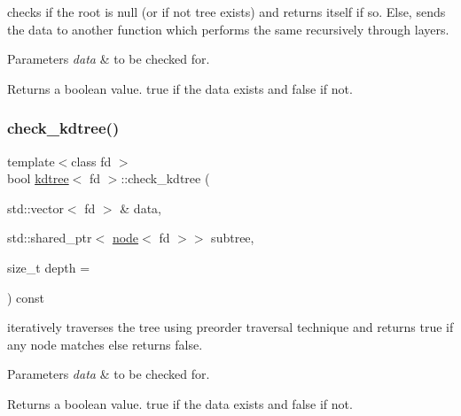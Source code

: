 checks if the root is null (or if not tree exists) and returns itself if so. Else, sends the data to another function which performs the same recursively through layers. 


\begin{DoxyParams}{Parameters}
{\em data} & to be checked for. \\
\hline
\end{DoxyParams}
\begin{DoxyReturn}{Returns}
a boolean value. true if the data exists and false if not. 
\end{DoxyReturn}
\mbox{\label{classkdtree_a1ae73ba437b116c077d72f1895aeaf52}} 
\subsubsection{\texorpdfstring{check\+\_\+kdtree()}{check\_kdtree()}\hspace{0.1cm}{\footnotesize\ttfamily [2/2]}}
{\footnotesize\ttfamily template$<$class fd $>$ \\
bool \hyperlink{classkdtree}{kdtree}$<$ fd $>$\+::check\+\_\+kdtree (\begin{DoxyParamCaption}\item[{std\+::vector$<$ fd $>$ \&}]{data,  }\item[{std\+::shared\+\_\+ptr$<$ \hyperlink{classnode}{node}$<$ fd $>$$>$}]{subtree,  }\item[{size\+\_\+t}]{depth = {} }\end{DoxyParamCaption}) const}



iteratively traverses the tree using preorder traversal technique and returns true if any node matches else returns false. 


\begin{DoxyParams}{Parameters}
{\em data} & to be checked for. \\
\hline
\end{DoxyParams}
\begin{DoxyReturn}{Returns}
a boolean value. true if the data exists and false if not. 
\end{DoxyReturn}
\mbox{\label{classkdtree_a530cb40f47ab46fb97125028da30744d}} 
